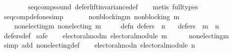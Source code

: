 \begin{isabellebody}
\ \ \ \ \ \ \ \ seq{\isacharunderscore}{\kern0pt}comp{\isacharunderscore}{\kern0pt}sound\ defer{\isacharunderscore}{\kern0pt}lift{\isacharunderscore}{\kern0pt}invariance{\isacharunderscore}{\kern0pt}def\isanewline
\ \ \isamarkupfalse%
\ {\isacharparenleft}{\kern0pt}metis\ {\isacharparenleft}{\kern0pt}full{\isacharunderscore}{\kern0pt}types{\isacharparenright}{\kern0pt}{\isacharparenright}{\kern0pt}%
\endisatagproof
{\isafoldproof}%
%
\isadelimproof
\isanewline
%
\endisadelimproof
\isanewline
\isanewline
{}\isamarkupfalse%
\ seq{\isacharunderscore}{\kern0pt}comp{\isacharunderscore}{\kern0pt}def{\isacharunderscore}{\kern0pt}one{\isacharbrackleft}{\kern0pt}simp{\isacharbrackright}{\kern0pt}{\isacharcolon}{\kern0pt}\isanewline
\ \ \isanewline
\ \ \ \ non{\isacharunderscore}{\kern0pt}blocking{\isacharunderscore}{\kern0pt}m{\isacharcolon}{\kern0pt}\ {\isachardoublequoteopen}non{\isacharunderscore}{\kern0pt}blocking\ m{\isachardoublequoteclose}\ \isanewline
\ \ \ \ non{\isacharunderscore}{\kern0pt}electing{\isacharunderscore}{\kern0pt}m{\isacharcolon}{\kern0pt}\ {\isachardoublequoteopen}non{\isacharunderscore}{\kern0pt}electing\ m{\isachardoublequoteclose}\ \isanewline
\ \ \ \ def{\isacharunderscore}{\kern0pt}{}{\isacharunderscore}{\kern0pt}n{\isacharcolon}{\kern0pt}\ {\isachardoublequoteopen}defers\ {}\ n{\isachardoublequoteclose}\isanewline
\ \ \ {\isachardoublequoteopen}defers\ {}\ {\isacharparenleft}{\kern0pt}m\ {\isasymtriangleright}\ n{\isacharparenright}{\kern0pt}{\isachardoublequoteclose}\isanewline
%
\isadelimproof
\ \ %
\endisadelimproof
%
\isatagproof
{}\isamarkupfalse%
\ defers{\isacharunderscore}{\kern0pt}def\isanewline
{}\isamarkupfalse%
\ {\isacharparenleft}{\kern0pt}safe{\isacharparenright}{\kern0pt}\isanewline
\ \ \isamarkupfalse%
\ electoral{\isacharunderscore}{\kern0pt}mod{\isacharunderscore}{\kern0pt}m{\isacharcolon}{\kern0pt}\ {\isachardoublequoteopen}electoral{\isacharunderscore}{\kern0pt}module\ m{\isachardoublequoteclose}\isanewline
\ \ \ \ \isamarkupfalse%
\ non{\isacharunderscore}{\kern0pt}electing{\isacharunderscore}{\kern0pt}m\isanewline
\ \ \ \ \isamarkupfalse%
\ {\isacharparenleft}{\kern0pt}simp\ add{\isacharcolon}{\kern0pt}\ non{\isacharunderscore}{\kern0pt}electing{\isacharunderscore}{\kern0pt}def{\isacharparenright}{\kern0pt}\isanewline
\ \ \isamarkupfalse%
\ electoral{\isacharunderscore}{\kern0pt}mod{\isacharunderscore}{\kern0pt}n{\isacharcolon}{\kern0pt}\ {\isachardoublequoteopen}electoral{\isacharunderscore}{\kern0pt}module\ n{\isachardoublequoteclose}\isanewline

\end{isabellebody}
